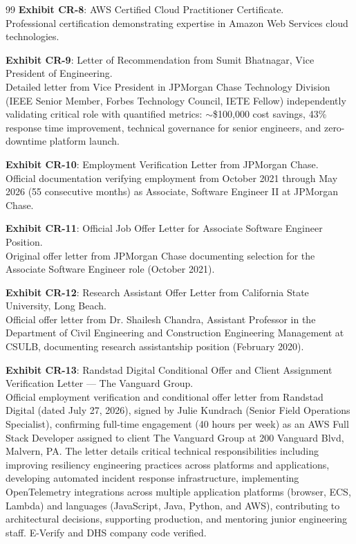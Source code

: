 \documentclass[11pt]{article}
\begin{document}
\begin{thebibliography}{99}
\textbf{Exhibit CR-8}: AWS Certified Cloud Practitioner Certificate.
\\Professional certification demonstrating \drs expertise in Amazon Web Services cloud technologies.

\textbf{Exhibit CR-9}: Letter of Recommendation from Sumit Bhatnagar, Vice President of Engineering.
\\Detailed letter from Vice President in JPMorgan Chase Technology Division (IEEE Senior Member, Forbes Technology Council, IETE Fellow) independently validating \drs critical role with quantified metrics: $\sim$\$100,000 cost savings, 43\% response time improvement, technical governance for senior engineers, and zero-downtime platform launch.

\textbf{Exhibit CR-10}: Employment Verification Letter from JPMorgan Chase.
\\Official documentation verifying \drs employment from October 2021 through May 2026 (55 consecutive months) as Associate, Software Engineer II at JPMorgan Chase.

\textbf{Exhibit CR-11}: Official Job Offer Letter for Associate Software Engineer Position.
\\Original offer letter from JPMorgan Chase documenting \drs selection for the Associate Software Engineer role (October 2021).

\textbf{Exhibit CR-12}: Research Assistant Offer Letter from California State University, Long Beach.
\\Official offer letter from Dr. Shailesh Chandra, Assistant Professor in the Department of Civil Engineering and Construction Engineering Management at CSULB, documenting research assistantship position (February 2020).

\textbf{Exhibit CR-13}: Randstad Digital Conditional Offer and Client Assignment Verification Letter --- The Vanguard Group.
\\Official employment verification and conditional offer letter from Randstad Digital (dated July 27, 2026), signed by Julie Kundrach (Senior Field Operations Specialist), confirming \drs full-time engagement (40 hours per week) as an AWS Full Stack Developer assigned to client The Vanguard Group at 200 Vanguard Blvd, Malvern, PA. The letter details critical technical responsibilities including improving resiliency engineering practices across platforms and applications, developing automated incident response infrastructure, implementing OpenTelemetry integrations across multiple application platforms (browser, ECS, Lambda) and languages (JavaScript, Java, Python, and AWS), contributing to architectural decisions, supporting production, and mentoring junior engineering staff. E-Verify and DHS company code verified.


\end{thebibliography}
\end{document}
